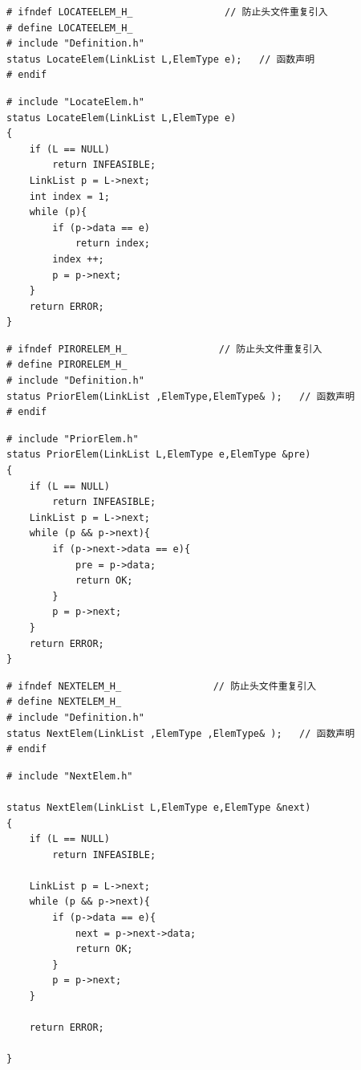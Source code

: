 \documentclass[supercite]{Experimental_Report}
\theoremstyle{definition}
\begin{document}
\begin{lstlisting}[title = LocateElem.h]
# ifndef LOCATEELEM_H_                // 防止头文件重复引入
# define LOCATEELEM_H_
# include "Definition.h"
status LocateElem(LinkList L,ElemType e);   // 函数声明
# endif
\end{lstlisting}

\begin{lstlisting}[title = LocateElem.cpp]
# include "LocateElem.h"
status LocateElem(LinkList L,ElemType e)
{
    if (L == NULL)
        return INFEASIBLE;
    LinkList p = L->next;
    int index = 1;
    while (p){
        if (p->data == e)
            return index;
        index ++;
        p = p->next;
    }
    return ERROR;
}
\end{lstlisting}

\begin{lstlisting}[title = PriorElem.h]
# ifndef PIRORELEM_H_                // 防止头文件重复引入
# define PIRORELEM_H_
# include "Definition.h"
status PriorElem(LinkList ,ElemType,ElemType& );   // 函数声明
# endif
\end{lstlisting}

\begin{lstlisting}[title = PriorElem.cpp]
# include "PriorElem.h"
status PriorElem(LinkList L,ElemType e,ElemType &pre)
{
    if (L == NULL)
        return INFEASIBLE;
    LinkList p = L->next;
    while (p && p->next){
        if (p->next->data == e){
            pre = p->data;
            return OK;
        }
        p = p->next;
    }
    return ERROR;
}
\end{lstlisting}

\begin{lstlisting}[title = NextElem.h]
# ifndef NEXTELEM_H_                // 防止头文件重复引入
# define NEXTELEM_H_
# include "Definition.h"
status NextElem(LinkList ,ElemType ,ElemType& );   // 函数声明
# endif
\end{lstlisting}

\begin{lstlisting}[title = NextElem.cpp]
# include "NextElem.h"

status NextElem(LinkList L,ElemType e,ElemType &next)
{
    if (L == NULL)
        return INFEASIBLE;

    LinkList p = L->next;
    while (p && p->next){
        if (p->data == e){
            next = p->next->data;
            return OK;
        }
        p = p->next;
    }
    
    return ERROR;

}
\end{lstlisting}
\end{document}
